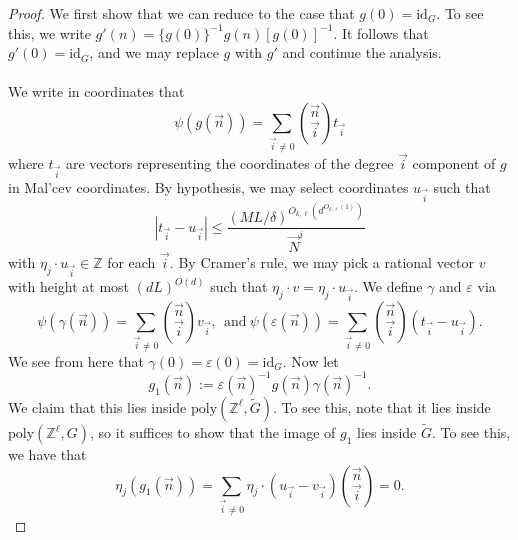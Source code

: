 \documentclass[11pt, a4paper]{amsart}
\theoremstyle{plain}
\theoremstyle{plain}
\theoremstyle{definition}
\theoremstyle{remark}
\numberwithin{equation}{section}
\numberwithin{lemma}{section}
\numberwithin{proposition}{section}
\numberwithin{corollary}{section}
\numberwithin{definition}{section}
\numberwithin{claim}{section}
\begin{document}
\begin{proof}
    We first show that we can reduce to the case that $g(0) = \mathrm{id}_G$. To see this, we write $g'(n) = \{g(0)\}^{-1}g(n)[g(0)]^{-1}$. It follows that $g'(0) = \mathrm{id}_G$, and we may replace $g$ with $g'$ and continue the analysis. \\\\
    We write in coordinates that
    $$\psi(g(\vec{n})) = \sum_{\vec{i} \neq 0} \binom{\vec{n}}{\vec{i}}t_{\vec{i}}$$
    where $t_{\vec{i}}$ are vectors representing the coordinates of the degree $\vec{i}$ component of $g$ in Mal'cev coordinates. By hypothesis, we may select coordinates $u_{\vec{i}}$ such that
    $$|t_{\vec{i}} - u_{\vec{i}}| \le \frac{(ML/\delta)^{O_{k, \ell}(d^{O_{k, \ell}(1)})}}{\vec{N}^i}$$
    with $\eta_j \cdot u_{\vec{i}} \in \mathbb{Z}$ for each $\vec{i}$. By Cramer's rule, we may pick a rational vector $v$ with height at most $(dL)^{O(d)}$ such that $\eta_j \cdot v = \eta_j \cdot u_{\vec{i}}$. We define $\gamma$ and $\varepsilon$ via
    $$\psi(\gamma(\vec{n})) = \sum_{\vec{i} \neq 0} \binom{\vec{n}}{\vec{i}} v_{\vec{i}},~~\text{and}~\psi(\varepsilon(\vec{n})) = \sum_{\vec{i} \neq 0} \binom{\vec{n}}{\vec{i}}(t_{\vec{i}} - u_{\vec{i}}).$$
    We see from here that $\gamma(0) = \varepsilon(0) = \mathrm{id}_G$. Now let
    $$g_1(\vec{n}) := \varepsilon(\vec{n})^{-1}g(\vec{n})\gamma(\vec{n})^{-1}.$$
    We claim that this lies inside $\mathrm{poly}(\mathbb{Z}^\ell, \tilde{G})$. To see this, note that it lies inside $\mathrm{poly}(\mathbb{Z}^\ell, G)$, so it suffices to show that the image of $g_1$ lies inside $\tilde{G}$. To see this, we have that
    $$\eta_j(g_1(\vec{n})) = \sum_{\vec{i} \neq 0} \eta_{j} \cdot (u_{\vec{i}} - v_{\vec{i}}) \binom{\vec{n}}{\vec{i}} = 0.$$
\end{proof}
\end{document}
